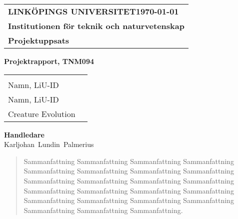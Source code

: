 \documentclass[10pt, titlepage, oneside, a4paper]{article}
\def\inst{teknik och naturvetenskap}
\def\typeofdoc{Projektuppsats}
\def\course{Projektrapport, TNM094}
\def\name{\\ Namn, LiU-ID \\ Namn, LiU-ID \\ Creature Evolution}
\def\graders{Karljohan Lundin Palmerius}
\begin{document}
	\begin{titlepage}
		\thispagestyle{empty}
		\begin{large}
			\begin{tabular}{@{}p{\textwidth}@{}}
				\textbf{LINKÖPINGS UNIVERSITET\hfill \today} \\
				\textbf{Institutionen för \inst} \\
				\textbf{\typeofdoc} \\
			\end{tabular}
		\end{large}
		\vspace{10mm}
		\begin{center}
			\huge{\textbf{\course}}\\
			\vspace{10mm}
			\vspace{15mm}
			\begin{center}
				\begin{large}
					\begin{tabular}{ll}
						\textbf{} & \name \\
					\end{tabular}
				\end{large}
			\end{center}
			\vfill
			\large{\textbf{Handledare}}\\
			\mbox{\large{\graders}}
		\end{center}
	\end{titlepage}


	\rfoot{\footnotesize{\today}}
	\lhead{\sc\footnotesize\title}
	\rhead{\nouppercase{\sc\footnotesize\leftmark}}
	\pagestyle{fancy}
	\renewcommand{\headrulewidth}{0.2pt}
	\renewcommand{\footrulewidth}{0.2pt}

	\begin{abstract}
		Sammanfattning Sammanfattning Sammanfattning Sammanfattning Sammanfattning Sammanfattning Sammanfattning Sammanfattning Sammanfattning Sammanfattning Sammanfattning Sammanfattning Sammanfattning Sammanfattning Sammanfattning Sammanfattning Sammanfattning Sammanfattning Sammanfattning Sammanfattning Sammanfattning Sammanfattning Sammanfattning.
	\end{abstract}
	
\end{document}
